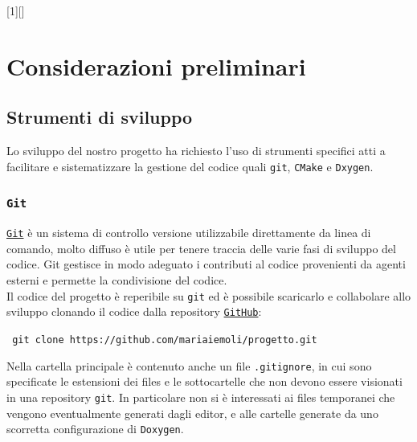 [1][]{ }{}


\chapter{Considerazioni preliminari}

\section{Strumenti di sviluppo}
Lo sviluppo del nostro progetto ha richiesto l'uso di strumenti specifici atti a facilitare e sistematizzare la gestione del codice quali \texttt{git}, \texttt{CMake} e \texttt{Dxygen}.\\

\subsection{\texttt{Git}}
\href{https://github.com/}{\texttt{Git}} è un sistema di controllo versione utilizzabile direttamente da linea di comando, molto diffuso è utile per tenere traccia delle varie fasi di sviluppo del codice. Git gestisce in modo adeguato i contributi al codice provenienti da agenti esterni e permette la condivisione del codice.\\
Il codice del progetto è reperibile su \texttt{git} ed è possibile scaricarlo e collabolare allo sviluppo clonando il codice dalla repository  \href{https://github.com/}{\texttt{GitHub}}:\\
\begin{center}
\texttt{ git clone https://github.com/mariaiemoli/progetto.git}
\end{center}
Nella cartella principale è contenuto anche un file \texttt{.gitignore}, in cui sono specificate le estensioni dei files e le sottocartelle che non devono essere visionati in una repository \texttt{git}. In particolare non si è interessati ai files temporanei che vengono eventualmente generati dagli editor, e alle cartelle generate da uno scorretta configurazione di \texttt{Doxygen}.

